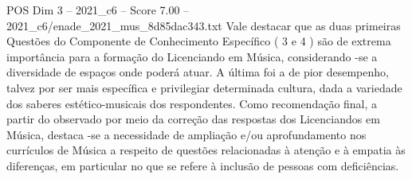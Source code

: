 \begin{textsample}{POS Dim 3 – 2021\_c6 – Score 7.00 – 2021\_c6/enade\_2021\_mus\_8d85dac343.txt}
Vale destacar que as duas primeiras Questões do Componente de Conhecimento Específico ( 3 e 4 ) são de extrema importância para a formação do Licenciando em Música, considerando -se a diversidade de espaços onde poderá atuar.
A última foi a de pior desempenho, talvez por ser mais específica e privilegiar determinada cultura, dada a variedade dos saberes estético-musicais dos respondentes.
Como recomendação final, a partir do observado por meio da correção das respostas dos Licenciandos em Música, destaca -se a necessidade de ampliação e/ou aprofundamento nos currículos de Música a respeito de questões relacionadas à atenção e à empatia às diferenças, em particular no que se refere à inclusão de pessoas com deficiências.

\end{textsample}
